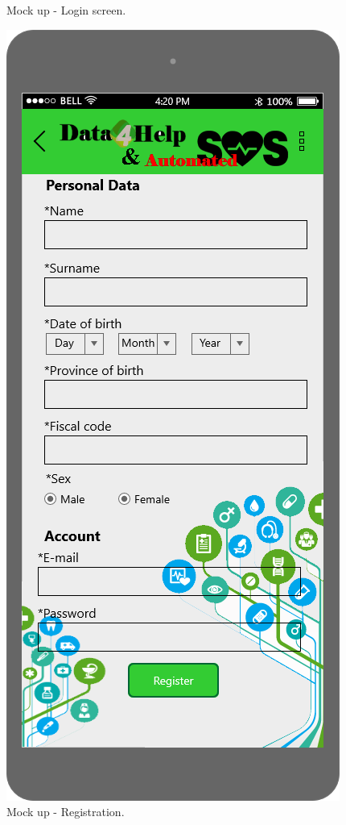 \begin{figure}[h!]
\begin{minipage}[b]{0.25\textwidth}
    		\caption{Mock up - Login screen.}
  	\end{minipage}
	\hfill
 	\begin{minipage}[b]{0.25\textwidth}
    		\includegraphics[width=\textwidth]{./pictures/user_registration.png}
    		\caption{Mock up - Registration.}
	\end{minipage}
\end{figure}


